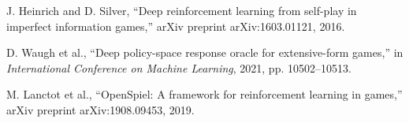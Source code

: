 \documentclass{icml2024}
\begin{document}
\begin{thebibliography}{99}
J. Heinrich and D. Silver, ``Deep reinforcement learning from self-play in imperfect information games,'' arXiv preprint arXiv:1603.01121, 2016.

D. Waugh et al., ``Deep policy-space response oracle for extensive-form games,'' in \emph{International Conference on Machine Learning}, 2021, pp. 10502--10513.

M. Lanctot et al., ``OpenSpiel: A framework for reinforcement learning in games,'' arXiv preprint arXiv:1908.09453, 2019.

\end{thebibliography}
\end{document}
